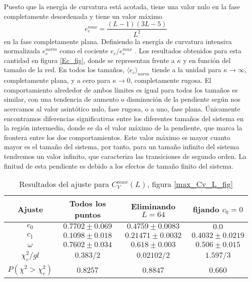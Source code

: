 Puesto que la energía de curvatura está acotada, tiene una valor nulo
en la fase completamente desordenada y tiene un valor máximo 
\begin{equation}\label{max_ecurvatura}
e^{max}_c = \frac{(L-1)(3L-5)}{L^2}
\end{equation}
en la fase completamente plana. Definiendo la energía de
curvatura intensiva normalizada $e_c^{norm}$  como el cociente
$e_c/ e_c^{max}$ . Los resultados obtenidos para
esta cantidad en figura \eqref{Ec_fig}, donde se
representan frente a $\kappa$ y en función del tamaño de
la red. En todos los tamaños, $\langle e_c\rangle_{norm}$ tiende a la unidad para
$\kappa\rightarrow \infty$, completamente plana, y a cero para
$\kappa\rightarrow 0$, completamente rugosa. El comportamiento alrededor de ambos
límites es igual para todos los tamaños es similar, con una tendencia de aumento o
disminución de la pendiente según nos acercamos al valor asintótico nulo, fase
rugosa, o a uno, fase plana. Únicamente encontramos
diferencias significativas entre los diferentes tamaños del sistema en la
región intermedia, donde se da el valor 
máximo de la pendiente, que marca la frontera entre los dos
comportamientos. Este valor máximo es mayor cuanto mayor es el tamaño del
sistema, por tanto, para un tamaño infinito del sistema tendremos un valor
infinito, que caracteriza las transiciones de segundo orden. La finitud de
esta pendiente es debido a los efectos de tamaño finito del sistema. 


\begin{table}
\begin{tabular}{|c|c|c|c|}\hline
 Ajuste   & Todos los puntos   & Eliminando $L=64$    & fijando $c_0=0$\\ \hline
 $c_0$    & $0.7702\pm 0.069 $ &  $0.4759\pm 0.0083 $ & $0.0$ \\ \hline
 $c_1$    & $0.1098 \pm 0.018$ &  $0.21471\pm 0.0032$ & $0.4032\pm 0.0219$ \\ \hline
 $\omega$ & $0.7602\pm 0.034$  &  $ 0.618\pm0.003$    & $0.506\pm 0.015$ \\ \hline
 $\chi_c^2/gl$ &  $0.383/2$ & $0.02102/2$ &  $1.597/3$ \\ \hline
 $P(\chi^2>\chi_c^2)$&  $0.8257$& $0.8847$ &  $0.660$ \\ \hline
\end{tabular}
\caption{Resultados del ajuste para $C_V^{max}(L)$, figura \ref{max_Cv_L_fig}}
\end{table}


